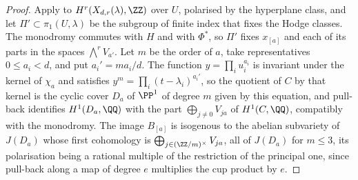 \begin{proof}
Apply  to $H^{r}(X_{d,r}(\lambda),\ZZ)$ over $U$,
polarised by the hyperplane class, and let $\Pi'\subset\pi_{1}(U,\lambda)$ be
the subgroup of finite index that fixes the Hodge classes. The monodromy
commutes with $H$ and with $\Phi^{*}$, so $\Pi'$ fixes $x_{[a]}$ and each of
its parts in the spaces $\bigwedge^{r}V_{a'}$. Let $m$ be the order of $a$,
take representatives $0\le a_{i}<d$, and put $a_{i}'=ma_{i}/d$. The function
$y=\prod_{i}u_{i}^{a_{i}}$ is invariant under the kernel of $\chi_{a}$ and
satisfies $y^{m}=\prod_{i}(t-\lambda_{i})^{a_{i}'}$, so the quotient of $C$ by
that kernel is the cyclic cover $D_{a}$ of $\PP^{1}$ of degree $m$ given by
this equation, and pull-back identifies $H^{1}(D_{a},\QQ)$ with the part
$\bigoplus_{j\ne0}V_{ja}$ of $H^{1}(C,\QQ)$, compatibly with the monodromy.
The image $B_{[a]}$ is isogenous to the abelian subvariety of $J(D_{a})$
whose first cohomology is $\bigoplus_{j\in(\ZZ/m)^{\times}}V_{ja}$, all of
$J(D_{a})$ for $m\le3$, its polarisation being a rational multiple of the
restriction of the principal one, since pull-back along a map of degree $e$
multiplies the cup product by $e$.


\end{proof}
